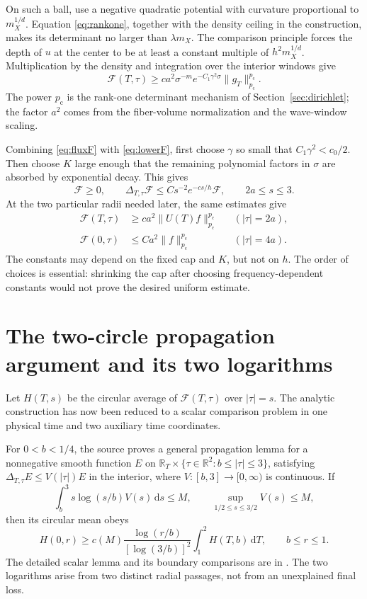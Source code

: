 \documentclass[11pt,a4paper]{article}
\numberwithin{equation}{section}
\theoremstyle{definition}
\theoremstyle{remark}
\newcommand{\R}{\mathbb R}
\newcommand{\dd}{\,\mathrm d}
\newcommand{\pc}{p_{\mathrm c}}
\begin{document}
On such a ball, use a negative quadratic potential with curvature proportional
to $m_X^{1/d}$. Equation \eqref{eq:rankone}, together with the density ceiling
in the construction, makes its determinant no larger than $\lambda m_X$.
The comparison principle forces the depth of $u$ at the center to be at least
a constant multiple of $h^2m_X^{1/d}$. Multiplication by the density and
integration over the interior windows give
\begin{equation}\label{eq:lowerF}
 \mathcal F(T,\tau)\ge
 c a^2\sigma^{-m}e^{-C_1\gamma^2\sigma}\|g_T\|_{\pc}^{\pc}.
\end{equation}
The power $\pc$ is the rank-one determinant mechanism of
Section~\ref{sec:dirichlet}; the factor $a^2$ comes from the fiber-volume
normalization and the wave-window scaling.

Combining \eqref{eq:fluxF} with \eqref{eq:lowerF}, first choose $\gamma$ so small
that $C_1\gamma^2<c_0/2$. Then choose $K$ large enough that the remaining
polynomial factors in $\sigma$ are absorbed by exponential decay. This gives
\begin{equation}\label{eq:scalarinequality}
 \mathcal F\ge0,\qquad
 \Delta_{T,\tau}\mathcal F
 \le C s^{-2}e^{-cs/h}\mathcal F,
 \qquad 2a\le s\le3.
\end{equation}
At the two particular radii needed later, the same estimates give
\begin{align}
 \mathcal F(T,\tau)&\ge c a^2\|U(T)f\|_{\pc}^{\pc}
                         &&(|\tau|=2a),\label{eq:innerobserve}\\
 \mathcal F(0,\tau)&\le C a^2\|f\|_{\pc}^{\pc}
                         &&(|\tau|=4a).\label{eq:outerinitial}
\end{align}
The constants may depend on the fixed cap and $K$, but not on $h$. The order
of choices is essential: shrinking the cap after choosing frequency-dependent
constants would not prove the desired uniform estimate.

\section{The two-circle propagation argument and its two logarithms}
\label{sec:propagate}
Let $H(T,s)$ be the circular average of $\mathcal F(T,\tau)$ over $|\tau|=s$.
The analytic construction has now been reduced to a scalar comparison problem
in one physical time and two auxiliary time coordinates.

For $0<b<1/4$, the source proves a general propagation lemma for a nonnegative smooth function $E$ on $\R_T\times\{\tau\in\R^2:b\le|\tau|\le3\}$, satisfying $\Delta_{T,\tau}E\le V(|\tau|)E$ in the interior, where $V:[b,3]\to[0,\infty)$ is continuous. If
\[
 \int_b^3 s\log(s/b)V(s)\dd s\le M,
 \qquad \sup_{1/2\le s\le3/2}V(s)\le M,
\]
then its circular mean obeys
\begin{equation}\label{eq:propagation}
 H(0,r)\ge c(M)
 \frac{\log(r/b)}{[\log(3/b)]^2}
             \int_1^2 H(T,b)\dd T,
 \qquad b\le r\le1.
\end{equation}
The detailed scalar lemma and its boundary comparisons are in
\cite{propagation}. The two logarithms arise from two distinct radial passages,
not from an unexplained final loss.
\end{document}
